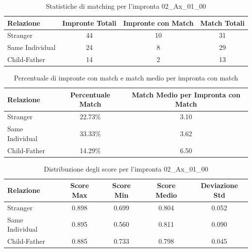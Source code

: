 \begin{table}[htbp]
\centering
\caption{Statistiche di matching per l'impronta 02\_Ax\_01\_00}
\label{tab:results_02_Ax_01_00}
\begin{tabular}{|l|c|c|c|}
\hline
\textbf{Relazione} & \textbf{Impronte Totali} & \textbf{Impronte con Match} & \textbf{Match Totali} \\
\hline
Stranger & 44 & 10 & 31 \\
\hline
Same Individual & 24 & 8 & 29 \\
\hline
Child-Father & 14 & 2 & 13 \\
\hline
\end{tabular}
\end{table}


\begin{table}[htbp]
\centering
\caption{Percentuale di impronte con match e match medio per impronta con match}
\label{tab:match_percentage_02_Ax_01_00}
\begin{tabular}{|l|c|c|}
\hline
\textbf{Relazione} & \textbf{Percentuale Match} & \textbf{Match Medio per Impronta con Match} \\
\hline
Stranger & 22.73\% & 3.10 \\
\hline
Same Individual & 33.33\% & 3.62 \\
\hline
Child-Father & 14.29\% & 6.50 \\
\hline
\end{tabular}
\end{table}


\begin{table}[htbp]
\centering
\caption{Distribuzione degli score per l'impronta 02\_Ax\_01\_00}
\label{tab:scores_02_Ax_01_00}
\begin{tabular}{|l|c|c|c|c|}
\hline
\textbf{Relazione} & \textbf{Score Max} & \textbf{Score Min} & \textbf{Score Medio} & \textbf{Deviazione Std} \\
\hline
Stranger & 0.898 & 0.699 & 0.804 & 0.052 \\
\hline
Same Individual & 0.895 & 0.560 & 0.811 & 0.090 \\
\hline
Child-Father & 0.885 & 0.733 & 0.798 & 0.045 \\
\hline
\end{tabular}
\end{table}

